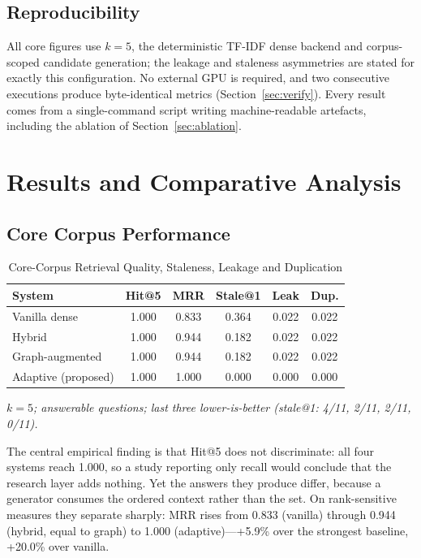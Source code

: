 \documentclass[conference]{IEEEtran}
\begin{document}
\subsection{Reproducibility}
All core figures use $k = 5$, the deterministic TF-IDF dense backend and corpus-scoped candidate generation; the leakage and staleness asymmetries are stated for exactly this configuration. No external GPU is required, and two consecutive executions produce byte-identical metrics (Section~\ref{sec:verify}). Every result comes from a single-command script writing machine-readable artefacts, including the ablation of Section~\ref{sec:ablation}.

\section{Results and Comparative Analysis}
\label{sec:results}

\subsection{Core Corpus Performance}

\begin{table}[htbp]
\caption{Core-Corpus Retrieval Quality, Staleness, Leakage and Duplication}
\label{tab:core}
\centering
\scriptsize
\begin{tabular}{|l|c|c|c|c|c|}
\hline
\textbf{System} & \textbf{Hit@5} & \textbf{MRR} & \textbf{Stale@1} & \textbf{Leak} & \textbf{Dup.} \\
\hline
Vanilla dense & 1.000 & 0.833 & 0.364 & 0.022 & 0.022 \\
\hline
Hybrid & 1.000 & 0.944 & 0.182 & 0.022 & 0.022 \\
\hline
Graph-augmented & 1.000 & 0.944 & 0.182 & 0.022 & 0.022 \\
\hline
Adaptive (proposed) & 1.000 & 1.000 & 0.000 & 0.000 & 0.000 \\
\hline
\end{tabular}
\vspace{0.5mm}

{\scriptsize\itshape $k = 5$; answerable questions; last three lower-is-better (stale@1: 4/11, 2/11, 2/11, 0/11).}
\end{table}

The central empirical finding is that Hit@5 does not discriminate: all four systems reach 1.000, so a study reporting only recall would conclude that the research layer adds nothing. Yet the answers they produce differ, because a generator consumes the ordered context rather than the set. On rank-sensitive measures they separate sharply: MRR rises from 0.833 (vanilla) through 0.944 (hybrid, equal to graph) to 1.000 (adaptive)---+5.9\% over the strongest baseline, +20.0\% over vanilla.
\end{document}
